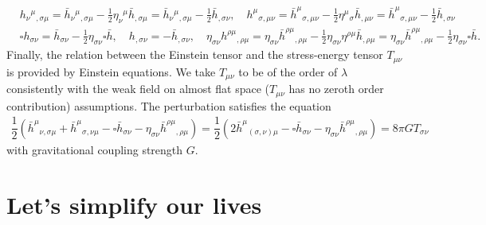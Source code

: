\documentclass[10pt, a4paper]{article}
\begin{document}
{\begin{align*}
  &h_{\nu}{}^{\mu}{}_{, \sigma \mu} = \bar{h}_{\nu}{}^{\mu}{}_{, \sigma \mu} - \frac{1}{2} \eta_{\nu}{}^{\mu} \bar{h}_{, \sigma \mu} = \bar{h}_{\nu}{}^{\mu}{}_{, \sigma \mu}- \frac{1}{2} \bar{h}_{, \sigma \nu}, \quad h^\mu{}_{\sigma, \mu \nu} = \bar{h}^\mu{}_{\sigma, \mu \nu} - \frac{1}{2}\eta^\mu{}_{\sigma} \bar{h}_{, \mu \nu} = \bar{h}^\mu{}_{\sigma, \mu \nu} - \frac{1}{2}\bar{h}_{, \sigma \nu}\\
  &\square h_{\sigma\nu} = \bar{h}_{\sigma\nu} - \frac{1}{2}\eta_{\sigma\nu} \square \bar{h}, \quad h_{, \sigma \nu} = -\bar{h}_{, \sigma \nu}, \quad \eta_{\sigma\nu} h^{\rho\mu}{}_{, \rho \mu} = \eta_{\sigma\nu}\bar{h}^{\rho\mu}{}_{, \rho \mu} - \frac{1}{2}\eta_{\sigma\nu}\eta^{\rho\mu} \bar{h}_{, \rho \mu} = \eta_{\sigma\nu}\bar{h}^{\rho\mu}{}_{, \rho \mu} - \frac{1}{2}\eta_{\sigma\nu} \square\bar{h}.
\end{align*}
Finally, the relation between the Einstein tensor and the stress-energy tensor $T_{\mu\nu}$ is provided by Einstein equations. We take $T_{\mu\nu}$ to be of the order of $\lambda$ consistently with the weak field on almost flat space ($T_{\mu\nu}$ has no zeroth order contribution) assumptions. The perturbation satisfies the equation 
\begin{align*}
  \dfrac{1}{2}(\bar{h}^{\mu}{}_{\nu, \sigma \mu}+ \bar{h}^\mu{}_{\sigma, \nu \mu} -\square\bar{h}_{\sigma\nu} -\eta_{\sigma\nu}\bar{h}^{\rho\mu}{}_{, \rho \mu}) = \dfrac{1}{2}( 2\bar{h}^\mu{}_{(\sigma, \nu) \mu} -\square\bar{h}_{\sigma\nu} -\eta_{\sigma\nu}\bar{h}^{\rho\mu}{}_{, \rho \mu}) = 8\pi G T_{\sigma \nu}
\end{align*}
with gravitational coupling strength $G$.
}


\section{Let’s simplify our lives}
\end{document}
